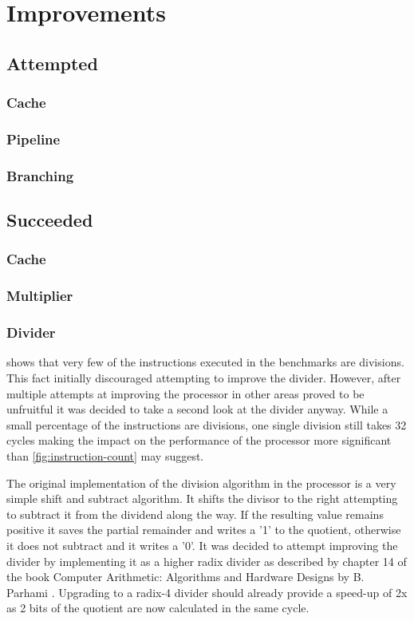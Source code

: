 \documentclass[final]{article}
\begin{document}
\section{Improvements}
\subsection{Attempted}
\subsubsection{Cache}
\subsubsection{Pipeline}
\subsubsection{Branching}
\subsection{Succeeded}
\subsubsection{Cache}
\subsubsection{Multiplier}
\subsubsection{Divider}
 shows that very few of the instructions executed in the benchmarks are divisions. This fact initially discouraged attempting to improve the divider. However, after multiple attempts at improving the processor in other areas proved to be unfruitful it was decided to take a second look at the divider anyway. While a small percentage of the instructions are divisions, one single division still takes 32 cycles making the impact on the performance of the processor more significant than \cref{fig:instruction-count} may suggest. 

The original implementation of the division algorithm in the processor is a very simple shift and subtract algorithm. It shifts the divisor to the right attempting to subtract it from the dividend along the way. If the resulting value remains positive it saves the partial remainder and writes a '1' to the quotient, otherwise it does not subtract and it writes a '0'. It was decided to attempt improving the divider by implementing it as a higher radix divider as described by chapter 14 of the book Computer Arithmetic: Algorithms and Hardware Designs by B. Parhami \cite{parhami}. Upgrading to a radix-4 divider should already provide a speed-up of 2x as 2 bits of the quotient are now calculated in the same cycle.
\end{document}

